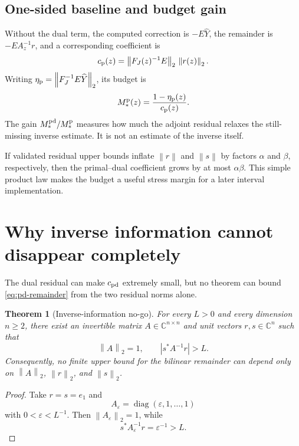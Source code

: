 \documentclass[11pt]{article}
\newtheorem{theorem}{Theorem}[section]
\theoremstyle{definition}
\theoremstyle{remark}
\newcommand{\C}{\mathbb C}
\newcommand{\norm}[1]{\left\lVert#1\right\rVert}
\begin{document}
\subsection{One-sided baseline and budget gain}

Without the dual term, the computed correction is \(-E\widehat Y\), the
remainder is \(-EA_z^{-1}r\), and a corresponding coefficient is
\begin{equation}
 c_{\rm p}(z)=\norm{F_J(z)^{-1}E}_2\,\norm{r(z)}_2.
 \label{eq:one-coefficient}
\end{equation}
Writing \(\eta_{\rm p}=\norm{F_J^{-1}E\widehat Y}_2\), its budget is
\begin{equation}
 M_*^{\rm p}(z)=\frac{1-\eta_{\rm p}(z)}{c_{\rm p}(z)}.
 \label{eq:one-budget}
\end{equation}
The gain \(M_*^{\rm pd}/M_*^{\rm p}\) measures how much the adjoint
residual relaxes the still-missing inverse estimate.  It is not an estimate
of the inverse itself.

If validated residual upper bounds inflate \(\norm r\) and \(\norm s\) by
factors \(\alpha\) and \(\beta\), respectively, then the primal--dual
coefficient grows by at most \(\alpha\beta\).  This simple product law makes
the budget a useful stress margin for a later interval implementation.

\section{Why inverse information cannot disappear completely}
\label{sec:nogo}

The dual residual can make \(c_{\rm pd}\) extremely small, but no theorem
can bound \cref{eq:pd-remainder} from the two residual norms alone.

\begin{theorem}[Inverse-information no-go]
\label{thm:no-go}
For every \(L>0\) and every dimension \(n\geq2\), there exist an invertible
matrix \(A\in\C^{n\times n}\) and unit vectors \(r,s\in\C^n\) such that
\begin{equation}
 \norm A_2=1,
 \qquad |s^*A^{-1}r|>L.
 \label{eq:no-go}
\end{equation}
Consequently, no finite upper bound for the bilinear remainder can depend
only on \(\norm A_2\), \(\norm r_2\), and \(\norm s_2\).
\end{theorem}

\begin{proof}
Take \(r=s=e_1\) and
\[
 A_\varepsilon=\operatorname{diag}(\varepsilon,1,\ldots,1)
\]
with \(0<\varepsilon<L^{-1}\).  Then \(\norm{A_\varepsilon}_2=1\), while
\[
 s^*A_\varepsilon^{-1}r=\varepsilon^{-1}>L.
\]
\end{proof}
\end{document}
